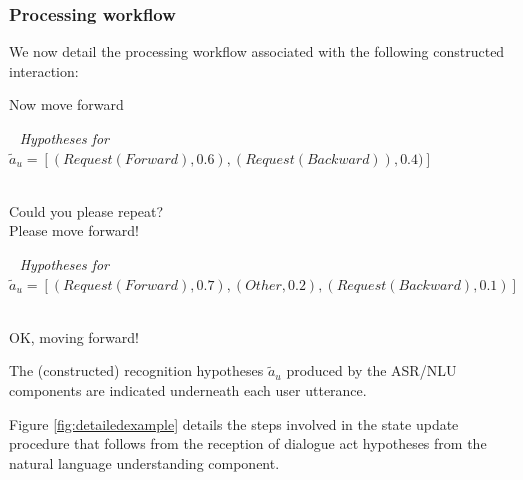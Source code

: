 \subsubsection*{Processing workflow}

We now detail the processing workflow associated with the following constructed interaction:
\begin{dialogue} 
 Now move forward \\ \begin{small} $\phantom{b}$ \textit{Hypotheses for} $\tilde{a}_u = [ (\mathit{Request(Forward)}, 0.6), (\mathit{Request(Backward)}), 0.4)]$\end{small}  \\[-3mm]
 Could you please repeat? \\[-3mm]
 Please move forward! \\ \begin{small}$\phantom{b}$ \textit{Hypotheses for} $\tilde{a}_u = [ (\mathit{Request(Forward)}, 0.7), (\mathit{Other}, 0.2), (\mathit{Request(Backward)}, 0.1) ]$\end{small} \\[-3mm]
 OK, moving forward!
\end{dialogue}
The (constructed) recognition hypotheses $\tilde{a}_u$ produced by the ASR/NLU components are indicated underneath each user utterance. 

Figure \ref{fig:detailedexample} details the steps involved in the state update procedure that follows from the reception of dialogue act hypotheses from the natural language understanding component. 


